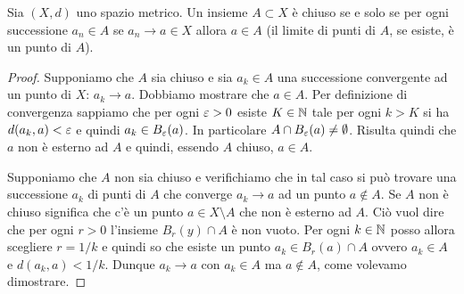 \begin{theorem}%
  \label{th:chiuso_sequenziale}%
Sia $(X,d)$ uno spazio metrico.
Un insieme $A\subset X$ è chiuso se e solo se
per ogni successione $a_n\in A$ se $a_n\to a\in X$ allora $a \in A$
(il limite di punti di $A$, se esiste, è un punto di $A$).
\end{theorem}
%
\begin{proof}
Supponiamo che $A$ sia chiuso e sia
$a_k \in A$ una successione convergente ad un punto di $X$: $a_k \to a$.
Dobbiamo mostrare che $a\in A$.
Per definizione di convergenza
sappiamo che per ogni $\varepsilon>0$ esiste $K\in {\mathbb N}$ tale per ogni $k> K$
si ha $d(a_k,a)<\varepsilon$ e quindi $a_k \in B_\varepsilon(a)$.
In particolare $A \cap B_\varepsilon(a) \neq \emptyset$.
Risulta quindi che $a$ non è esterno ad $A$ e quindi, essendo $A$ chiuso, $a\in A$.

Supponiamo che $A$ non sia chiuso e verifichiamo che in tal caso
si può trovare una successione $a_k$ di punti di $A$ che converge $a_k\to a$
ad un punto $a\not\in A$.
Se $A$ non è chiuso significa che c'è un punto $a \in X\setminus A$ che non è esterno ad $A$.
Ciò vuol dire che per ogni $r>0$ l'insieme $B_r(y)\cap A$ è non vuoto. Per ogni $k\in {\mathbb N}$ posso allora
scegliere $r=1/k$ e quindi so che esiste un punto $a_k\in B_r(a) \cap A$ ovvero $a_k \in A$ e
$d(a_k,a) < 1/k$.
Dunque $a_k \to a$ con $a_k\in A$ ma $a\not \in A$, come volevamo dimostrare.
\end{proof}

